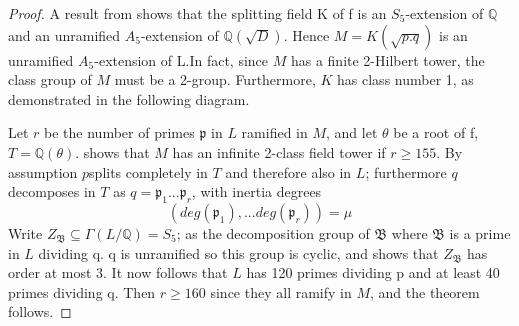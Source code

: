 \documentclass[12pt]{extarticle}
\newcommand{\Q}{\mathbb{Q}}
\newcommand{\<}{\langle}
\renewcommand{\>}{\rangle}
\theoremstyle{definition}
\begin{document}
\begin{proof}
A result from \cite{} shows that the splitting field K
of f is an $S_5$-extension of $\mathbb{Q}$ and an unramified $A_5$-extension of $\mathbb{Q}(\sqrt{D})$. Hence $M=K(\sqrt{p.q})$ is an
unramified $A_5$-extension of L.In fact, since $M$ has a finite 2-Hilbert tower, the class group of $M$ must be a 2-group.  Furthermore, $K$ has class number 1, as demonstrated in the following diagram.
\begin{center}
\end{center}

Let $r$ be the number of primes $\mathfrak{p}$ in $L$ ramified in $M$, and let $\theta$ be a root of f, $T = \mathbb{Q}(\theta)$. \cite{MART1978} shows that $M$ has an infinite 2-class field tower if $r\geq 155$. By assumption $p$splits completely in $T$ and therefore also in $L$; furthermore $q$ decomposes in $T$ as $q = \mathfrak{p}_1...\mathfrak{p}_r$, with inertia degrees
\begin{equation}
    (deg(\mathfrak{p}_1),...deg(\mathfrak{p}_r))=\mu 
\end{equation}
Write $Z_\mathfrak{B}\subseteq\Gamma(L/\Q) = S_5$; as the decomposition group of $\mathfrak{B}$ where $\mathfrak{B}$ is a prime in $L$ dividing q. q is unramified so this group is cyclic, and \cite{MART1978} shows that $Z_\mathfrak{B}$ has order at most 3.  It now follows that $L$ has 120 primes dividing p and at least 40 primes dividing q. Then $r\geq 160$ since they all ramify in $M$, and the theorem follows.
\end{proof}
\end{document}

